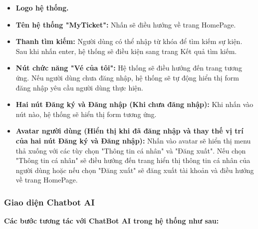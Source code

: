 \begin{itemize}
    \begin{itemize}
        \item[1.] \textbf{Logo hệ thống.}
        \item[2.] \textbf{Tên hệ thống "MyTicket":} Nhấn sẽ điều hướng về trang HomePage.
        \item[3.] \textbf{Thanh tìm kiếm:} Người dùng có thể nhập từ khóa để tìm kiếm sự kiện. Sau khi nhấn enter, hệ thống sẽ điều kiện sang trang Kết quả tìm kiếm.
        \item[4.] \textbf{Nút chức năng "Vé của tôi":} Hệ thống sẽ điều hướng đến trang tương ứng. Nếu người dùng chưa đăng nhập, hệ thống sẽ tự động hiển thị form đăng nhập yêu cầu người dùng thực hiện.
        \item[5.] \textbf{Hai nút Đăng ký và Đăng nhập (Khi chưa đăng nhập):} Khi nhấn vào nút nào, hệ thống sẽ hiển thị form tương ứng.
        \item[6.] \textbf{Avatar người dùng (Hiển thị khi đã đăng nhập và thay thế vị trí của hai nút Đăng ký và Đăng nhập):} Nhấn vào avatar sẽ hiển thị menu thả xuống với các tùy chọn "Thông tin cá nhân" và "Đăng xuất". Nếu chọn "Thông tin cá nhân" sẽ điều hướng đến trang hiển thị thông tin cá nhân của người dùng hoặc nếu chọn "Đăng xuất" sẽ đăng xuất tài khoản và điều hướng về trang HomePage.
    \end{itemize}
\end{itemize}

\subsubsection{Giao diện Chatbot AI}

\indent \indent \textbf{Các bước tương tác với ChatBot AI trong hệ thống như sau:}

